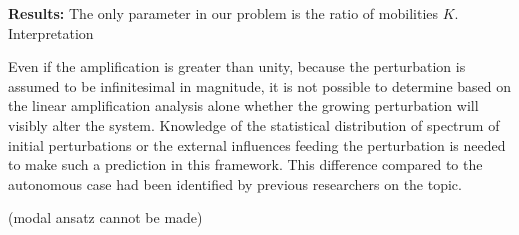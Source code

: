 \documentclass[letterpaper,10pt,prl,twocolumn,aps,reprint,superscriptaddress]{revtex4-1}
\begin{document}
{\bf Results: }
The only parameter in our problem is the ratio of mobilities $K$. 
Interpretation

\vspace{1cm}

Even if the amplification is greater than unity, because the perturbation is assumed to be infinitesimal in magnitude, it is not possible to determine based on the linear amplification analysis alone whether the growing perturbation will visibly alter the system. 
Knowledge of the statistical distribution of spectrum of initial perturbations or the external influences feeding the perturbation is needed to make such a prediction in this framework. 
This difference compared to the autonomous case had been identified by previous researchers on the topic.

(modal ansatz cannot be made)


% 

\newpage
\end{document}
